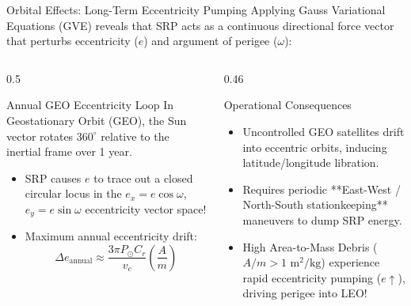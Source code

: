 \documentclass[aspectratio=169,11pt]{beamer}
\begin{document}
\begin{frame}{Orbital Effects: Long-Term Eccentricity Pumping}
    Applying Gauss Variational Equations (GVE) reveals that SRP acts as a continuous directional force vector that perturbs eccentricity ($e$) and argument of perigee ($\omega$):

    \begin{columns}[t]
        \begin{column}{0.5\textwidth}
            \begin{block}{Annual GEO Eccentricity Loop}
                In Geostationary Orbit (GEO), the Sun vector rotates $360^\circ$ relative to the inertial frame over 1 year.
                \begin{itemize}
                    \item SRP causes $e$ to trace out a closed circular locus in the $e_x = e\cos\omega$, $e_y = e\sin\omega$ eccentricity vector space!
                    \item Maximum annual eccentricity drift:
                    \begin{equation*}
                        \Delta e_{\text{annual}} \approx \frac{3\pi P_{\odot} C_r}{v_c} \left(\frac{A}{m}\right)
                    \end{equation*}
                \end{itemize}
            \end{block}
        \end{column}

        \begin{column}{0.46\textwidth}
            \begin{block}{Operational Consequences}
                \begin{itemize}
                    \item Uncontrolled GEO satellites drift into eccentric orbits, inducing latitude/longitude libration.
                    \item Requires periodic **East-West / North-South stationkeeping** maneuvers to dump SRP energy.
                    \item High Area-to-Mass Debris ($A/m > 1\text{ m}^2/\text{kg}$) experience rapid eccentricity pumping ($e \uparrow$), driving perigee into LEO!
                \end{itemize}
            \end{block}
        \end{column}
    \end{columns}
\end{frame}
\end{document}
